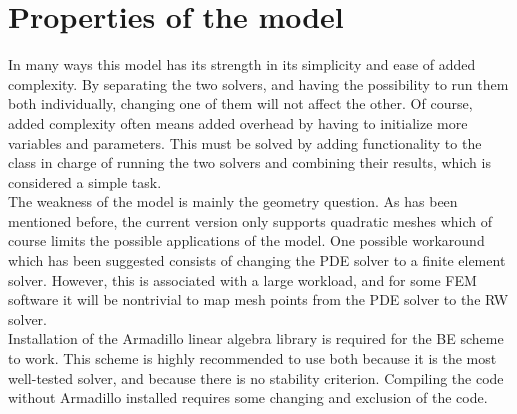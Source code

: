 \section{Properties of the model}

In many ways this model has its strength in its simplicity and ease of added complexity. 
By separating the two solvers, and having the possibility to run them both individually, changing one of them will not affect the other. 
Of course, added complexity often means added overhead by having to initialize more variables and parameters. 
This must be solved by adding functionality to the class in charge of running the two solvers and combining their results, which is considered a simple task. \\

The weakness of the model is mainly the geometry question. 
As has been mentioned before, the current version only supports quadratic meshes which of course limits the possible applications of the model. 
One possible workaround which has been suggested consists of changing the PDE solver to a finite element solver. 
However, this is associated with a large workload, and for some FEM software it will be nontrivial to map mesh points from the PDE solver to the RW solver.\\

Installation of the Armadillo linear algebra library is required for the BE scheme to work. 
This scheme is highly recommended to use both because it is the most well-tested solver, and because there is no stability criterion. 
Compiling the code without Armadillo installed requires some changing and exclusion of the code.